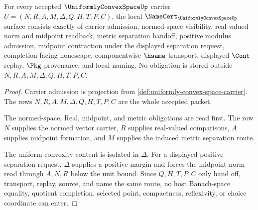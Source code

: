\begin{theorem}
\label{thm:uniformly-convex-space-namecert-obligations}
For every accepted $\UniformlyConvexSpaceUp$ carrier $U=(N,R,A,M,\Delta,Q,H,T,P,C)$, the local $\NameCert_{\UniformlyConvexSpaceUp}$ surface consists exactly of carrier admission, normed-space visibility, real-valued norm and midpoint readback, metric separation handoff, positive modulus admission, midpoint contraction under the displayed separation request, completion-facing nonescape, componentwise $\hsame$ transport, displayed $\Cont$ replay, $\Pkg$ provenance, and local naming. No obligation is stored outside $N,R,A,M,\Delta,Q,H,T,P,C$.
\end{theorem}
\begin{proof}
Carrier admission is projection from \autoref{def:uniformly-convex-space-carrier}. The rows $N,R,A,M,\Delta,Q,H,T,P,C$ are the whole accepted packet.

The normed-space, Real, midpoint, and metric obligations are read first. The row $N$ supplies the normed vector carrier, $R$ supplies real-valued comparisons, $A$ supplies midpoint formation, and $M$ supplies the induced metric separation route.

The uniform-convexity content is isolated in $\Delta$. For a displayed positive separation request, $\Delta$ supplies a positive margin and forces the midpoint norm read through $A,N,R$ below the unit bound. Since $Q,H,T,P,C$ only hand off, transport, replay, source, and name the same route, no host Banach-space equality, quotient completion, selected point, compactness, reflexivity, or choice coordinate can enter.
\end{proof}

